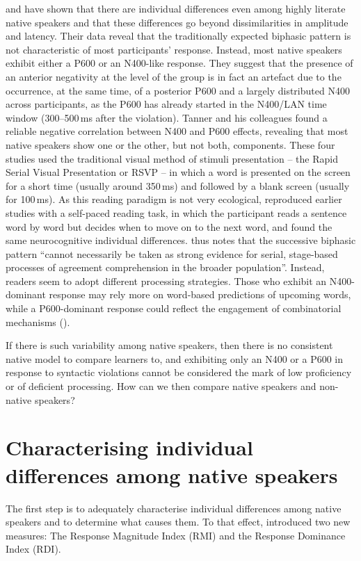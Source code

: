 \documentclass[output=paper,colorlinks,citecolor=brown,modfonts,nonflat]{../langscibook}
\begin{document}
\citet{Osterhout1997,TannerEtAl2013,TannerEtAl2014} and \citet{TannerHell2014} have shown that there are individual differences even among highly literate native speakers and that these differences go beyond dissimilarities in amplitude and latency. Their data reveal that the traditionally expected biphasic pattern is not characteristic of most participants’ response. Instead, most native speakers exhibit either a P600 or an N400-like response. They suggest that the presence of an anterior negativity at the level of the group is in fact an artefact due to the occurrence, at the same time, of a posterior P600 and a largely distributed N400 across participants, as the P600 has already started in the N400/LAN time window (300--500\,ms after the violation). Tanner and his colleagues found a reliable negative correlation between N400 and P600 effects, revealing that most native speakers show one or the other, but not both, components. These four studies used the traditional visual method of stimuli presentation – the Rapid Serial Visual Presentation or RSVP – in which a word is presented on the screen for a short time (usually around 350\,ms) and followed by a blank screen (usually for 100\,ms). As this reading paradigm is not very ecological, \citet{Tanner2019} reproduced earlier studies with a self-paced reading task, in which the participant reads a sentence word by word but decides when to move on to the next word, and found the same neurocognitive individual differences. \citet[232]{Tanner2019} thus notes that the successive biphasic pattern “cannot necessarily be taken as strong evidence for serial, stage-based processes of agreement comprehension in the broader population”. Instead, readers seem to adopt different processing strategies. Those who exhibit an N400-dominant response may rely more on word-based predictions of upcoming words, while a P600-dominant response could reflect the engagement of combinatorial mechanisms (\citealt{TannerHell2014}).

If there is such variability among native speakers, then there is no consistent native model to compare learners to, and exhibiting only an N400 or a P600 in response to syntactic violations cannot be considered the mark of low proficiency or of deficient processing. How can we then compare native speakers and non-native speakers? 

\section{Characterising individual differences among native speakers}
The first step is to adequately characterise individual differences among native speakers and to determine what causes them. To that effect, \citet{TannerEtAl2014} introduced two new measures: The Response Magnitude Index (RMI) and the Response Dominance Index (RDI). 
\end{document}
